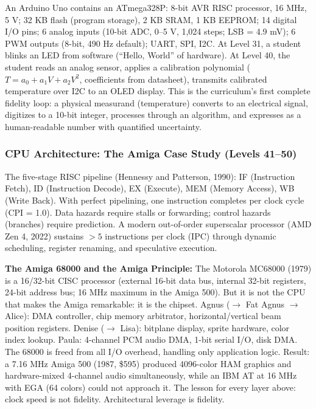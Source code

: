 \documentclass[11pt,letterpaper]{article}
\begin{document}
An Arduino Uno contains an ATmega328P: 8-bit AVR RISC processor, 16 MHz, 5 V; 32 KB flash
(program storage), 2 KB SRAM, 1 KB EEPROM; 14 digital I/O pins; 6 analog inputs (10-bit ADC,
0--5 V, 1,024 steps; LSB = 4.9 mV); 6 PWM outputs (8-bit, 490 Hz default); UART, SPI, I2C.
At Level 31, a student blinks an LED from software (``Hello, World'' of hardware). At Level 40,
the student reads an analog sensor, applies a calibration polynomial
($T = a_0 + a_1 V + a_2 V^2$, coefficients from datasheet), transmits calibrated temperature
over I2C to an OLED display. This is the curriculum's first complete fidelity loop: a physical
measurand (temperature) converts to an electrical signal, digitizes to a 10-bit integer, processes
through an algorithm, and expresses as a human-readable number with quantified uncertainty.

\subsubsection{CPU Architecture: The Amiga Case Study (Levels 41--50)}

The five-stage RISC pipeline (Hennessy and Patterson, 1990): IF (Instruction Fetch), ID
(Instruction Decode), EX (Execute), MEM (Memory Access), WB (Write Back). With perfect pipelining,
one instruction completes per clock cycle (CPI = 1.0). Data hazards require stalls or forwarding;
control hazards (branches) require prediction. A modern out-of-order superscalar processor
(AMD Zen 4, 2022) sustains $> 5$ instructions per clock (IPC) through dynamic scheduling,
register renaming, and speculative execution.

\textbf{The Amiga 68000 and the Amiga Principle:}
The Motorola MC68000 (1979) is a 16/32-bit CISC processor (external 16-bit data bus, internal
32-bit registers, 24-bit address bus; 16 MHz maximum in the Amiga 500). But it is not the CPU
that makes the Amiga remarkable: it is the chipset. Agnus ($\rightarrow$ Fat Agnus $\rightarrow$
Alice): DMA controller, chip memory arbitrator, horizontal/vertical beam position registers.
Denise ($\rightarrow$ Lisa): bitplane display, sprite hardware, color index lookup. Paula: 4-channel
PCM audio DMA, 1-bit serial I/O, disk DMA. The 68000 is freed from all I/O overhead, handling
only application logic. Result: a 7.16 MHz Amiga 500 (1987, \$595) produced 4096-color HAM
graphics and hardware-mixed 4-channel audio simultaneously, while an IBM AT at 16 MHz with EGA
(64 colors) could not approach it. The lesson for every layer above: clock speed is not fidelity.
Architectural leverage is fidelity.
\end{document}
